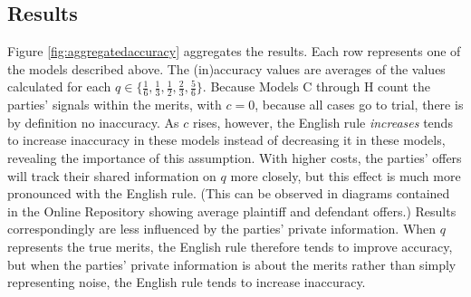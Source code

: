 \documentclass{article}
\begin{document}
\subsection{Results}

Figure \ref{fig:aggregatedaccuracy} aggregates the results. Each row represents one of the models described above. The (in)accuracy values are averages of the values calculated for each $q \in \{ \frac{1}{6}, \frac{1}{3}, \frac{1}{2}, \frac{2}{3}, \frac{5}{6} \}$. Because Models C through H count the parties' signals within the merits, with $c=0$, because all cases go to trial, there is by definition no inaccuracy. As $c$ rises, however, the English rule \textit{increases} tends to increase inaccuracy in these models instead of decreasing it in these models, revealing the importance of this assumption. With higher costs, the parties' offers will track their shared information on $q$ more closely, but this effect is much more pronounced with the English rule. (This can be observed in diagrams contained in the Online Repository showing average plaintiff and defendant offers.) Results correspondingly are less influenced by the parties' private information. When $q$ represents the true merits, the English rule therefore tends to improve accuracy, but when the parties' private information is about the merits rather than simply representing noise, the English rule tends to increase inaccuracy.
\end{document}
